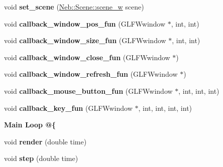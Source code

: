 \begin{DoxyCompactItemize}
\item 
\hypertarget{classNeb_1_1window_1_1window_a4f6c4f56754d6508b644f45873ae2333}{void {\bfseries set\-\_\-scene} (\hyperlink{classNeb_1_1weak__ptr}{\-Neb\-::\-Scene\-::scene\-\_\-w} scene)}\label{classNeb_1_1window_1_1window_a4f6c4f56754d6508b644f45873ae2333}

\item 
\hypertarget{classNeb_1_1window_1_1window_ae1d72bbacdcddcd15e41588ff7007e4f}{void {\bfseries callback\-\_\-window\-\_\-pos\-\_\-fun} (\-G\-L\-F\-Wwindow $\ast$, int, int)}\label{classNeb_1_1window_1_1window_ae1d72bbacdcddcd15e41588ff7007e4f}

\item 
\hypertarget{classNeb_1_1window_1_1window_a4e46f9e890fd37fd4cc8581db48deb42}{void {\bfseries callback\-\_\-window\-\_\-size\-\_\-fun} (\-G\-L\-F\-Wwindow $\ast$, int, int)}\label{classNeb_1_1window_1_1window_a4e46f9e890fd37fd4cc8581db48deb42}

\item 
\hypertarget{classNeb_1_1window_1_1window_a5de927572afed2cb2a7424863d2af4be}{void {\bfseries callback\-\_\-window\-\_\-close\-\_\-fun} (\-G\-L\-F\-Wwindow $\ast$)}\label{classNeb_1_1window_1_1window_a5de927572afed2cb2a7424863d2af4be}

\item 
\hypertarget{classNeb_1_1window_1_1window_a079777619dab317cae89917b800c76cb}{void {\bfseries callback\-\_\-window\-\_\-refresh\-\_\-fun} (\-G\-L\-F\-Wwindow $\ast$)}\label{classNeb_1_1window_1_1window_a079777619dab317cae89917b800c76cb}

\item 
\hypertarget{classNeb_1_1window_1_1window_a3058505d4878bf1a5ceed906c313c359}{void {\bfseries callback\-\_\-mouse\-\_\-button\-\_\-fun} (\-G\-L\-F\-Wwindow $\ast$, int, int, int)}\label{classNeb_1_1window_1_1window_a3058505d4878bf1a5ceed906c313c359}

\item 
\hypertarget{classNeb_1_1window_1_1window_a25eba608bb59811962adeb71510503ff}{void {\bfseries callback\-\_\-key\-\_\-fun} (\-G\-L\-F\-Wwindow $\ast$, int, int, int, int)}\label{classNeb_1_1window_1_1window_a25eba608bb59811962adeb71510503ff}

\end{DoxyCompactItemize}
\begin{Indent}{\bf \-Main \-Loop @\{}\par
\begin{DoxyCompactItemize}
\item 
\hypertarget{classNeb_1_1window_1_1window_a67657822c06744de46ace525b5a7bac3}{void {\bfseries render} (double time)}\label{classNeb_1_1window_1_1window_a67657822c06744de46ace525b5a7bac3}

\item 
\hypertarget{classNeb_1_1window_1_1window_a89a16c58a5a89beeef982b4fcd29c348}{void {\bfseries step} (double time)}\label{classNeb_1_1window_1_1window_a89a16c58a5a89beeef982b4fcd29c348}

\end{DoxyCompactItemize}
\end{Indent}
